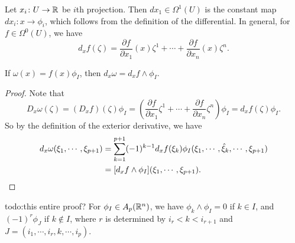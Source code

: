 \begin{example}
    Let $x_i  \colon U \to \mathbb{R}$ be $i$th projection. Then $dx_1 \in \Omega^1(U)$ is the constant map $dx_i \colon x \to \phi_i $, which follows from the definition of the differential. In general, for $f \in \Omega^0(U)$, we have \[
        d_x f(\zeta)= \frac{\partial f}{\partial x_1}(x)\zeta^1+\cdots + \frac{\partial f}{\partial x_n }(x)\zeta ^n .
    \] 
\end{example}

\begin{lemma}
    If $\omega(x)=f(x)\phi_I$, then $d_x\omega=d_x f \wedge \phi_I$.
\end{lemma}
\begin{proof}
    Note that \[
        D_x\omega(\zeta)=(D_x f)(\zeta)\phi_I =\left( \frac{\partial f}{\partial x_1}\zeta^1+\cdots + \frac{\partial f}{\partial x_n }\zeta^n  \right) \phi_I=d_xf (\zeta) \phi_I.
    \] So by the definition of the exterior derivative, we have 
    \begin{align*}
        d_x\omega(\xi_1,\cdots ,\xi_{p+1})&=\sum_{k=1}^{p+1} (-1)^{k-1}d_x f(\xi_k) \phi_I (\xi_1,\cdots ,\hat{\xi}_k,\cdots ,\xi_{p+1})\\
        &= [d_x f \wedge \phi_I](\xi_1,\cdots ,\xi_{p+1}).\qedhere
    \end{align*}
\end{proof}
{\color{red}todo:this entire proof?} For $\phi_I \in A_p(\mathbb{R}^n )$, we have $\phi_k \wedge \phi_I=0$ if $k \in I$, and $(-1)^r \phi_J$ if $k\notin I$, where $r$ is determined by $i_r < k < i_{r+1}$ and $J=(i_1,\cdots ,i_r,k,\cdots ,i_p)$.

